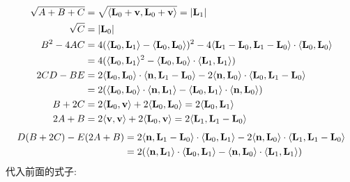\begin{align*}
\sqrt{A+B+C} &= \sqrt{\langle\bold{L}_0+\bold{v},\bold{L}_0+\bold{v}\rangle} = |\bold{L}_1| \\
\sqrt{C} &= |\bold{L}_0|\\
B^2-4AC &= 4(\langle\bold{L}_0,\bold{L}_1\rangle-\langle\bold{L}_0,\bold{L}_0\rangle)^2 - 4\langle\bold{L}_1-\bold{L}_0,\bold{L}_1-\bold{L}_0\rangle\cdot\langle\bold{L}_0,\bold{L}_0\rangle \\
&= 4(\langle\bold{L}_0,\bold{L}_1\rangle^2 - \langle\bold{L}_0,\bold{L}_0\rangle\cdot\langle\bold{L}_1,\bold{L}_1\rangle)\\
2CD-BE &= 2\langle\bold{L}_0,\bold{L}_0 \rangle\cdot\langle\bold{n},\bold{L}_1-\bold{L}_0\rangle - 2\langle\bold{n},\bold{L}_0 \rangle\cdot\langle\bold{L}_0,\bold{L}_1-\bold{L}_0\rangle\\
&= 2(\langle\bold{L}_0,\bold{L}_0 \rangle\cdot\langle\bold{n},\bold{L}_1\rangle - \langle\bold{L}_0,\bold{L}_1 \rangle\cdot\langle\bold{n},\bold{L}_0\rangle) \\
B+2C &= 2\langle\bold{L}_0,\bold{v}\rangle + 2\langle\bold{L}_0,\bold{L}_0\rangle = 2\langle\bold{L}_0,\bold{L}_1\rangle \\
2A+B &= 2\langle\bold{v},\bold{v}\rangle + 2\langle\bold{L}_0,\bold{v}\rangle = 2\langle\bold{L}_1,\bold{L}_1 - \bold{L}_0\rangle
\end{align*}
\begin{align*}
D(B+2C)-E(2A+B) &= 2\langle\bold{n},\bold{L}_1-\bold{L}_0\rangle \cdot \langle\bold{L}_0,\bold{L}_1\rangle - 2\langle\bold{n},\bold{L}_0\rangle\cdot\langle\bold{L}_1,\bold{L}_1 - \bold{L}_0\rangle\\
&= 2(\langle\bold{n},\bold{L}_1\rangle\cdot\langle\bold{L}_0,\bold{L}_1\rangle - \langle\bold{n},\bold{L}_0\rangle\cdot\langle\bold{L}_1,\bold{L}_1\rangle)
\end{align*}
代入前面的式子:

